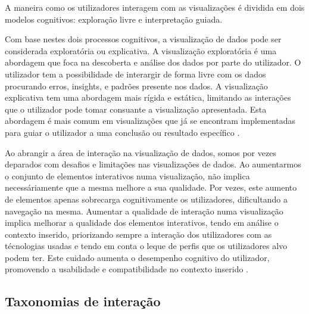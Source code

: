 A maneira como os utilizadores interagem com as visualizações é dividida em dois modelos cognitivos: exploração livre e interpretação guiada.

Com base nestes dois processos cognitivos, a visualização de dados pode ser considerada exploratória ou explicativa. A visualização exploratória é uma abordagem que foca na descoberta e análise dos dados por parte do utilizador. O utilizador tem a possibilidade de interargir de forma livre com os dados procurando erros, insights, e padrões presente nos dados. A visualização explicativa tem uma abordagem mais rígida e estática, limitando as interações que o utilizador pode tomar consuante a visualização apresentada. Esta abordagem é mais comum em visualizações que já se encontram implementadas para guiar o utilizador a uma conclusão ou resultado específico \cite{heer2012interactive}. 

Ao abrangir a área de interação na visualização de dados, somos por vezes deparados com desafios e limitações nas visualizações de dados. Ao aumentarmos o conjunto de elementos interativos numa visualização, não implica necessáriamente que a mesma melhore a sua qualidade. Por vezes, este aumento de elementos apenas sobrecarga cognitivamente os utilizadores, dificultando a navegação na mesma. Aumentar a qualidade de interação numa visualização implica melhorar a qualidade dos elementos interativos, tendo em análise o contexto inserido, priorizando sempre a interação dos utilizadores com as técnologias usadas e tendo em conta o leque de perfis que os utilizadores alvo podem ter. Este cuidado aumenta o desempenho cognitivo do utilizador, promovendo a usabilidade e compatibilidade no contexto inserido \cite{dimara2019interaction}. 


\subsection{Taxonomias de interação} %
\label{sub:taxonomias_interacao}

